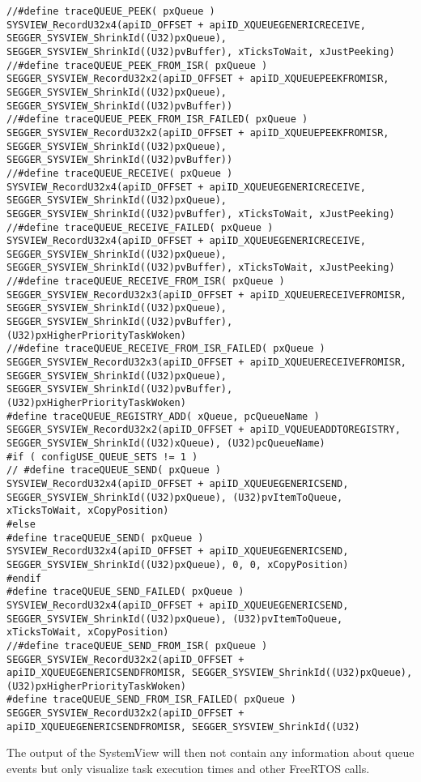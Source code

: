 \begin{lstlisting}
//#define traceQUEUE_PEEK( pxQueue )                                    SYSVIEW_RecordU32x4(apiID_OFFSET + apiID_XQUEUEGENERICRECEIVE, SEGGER_SYSVIEW_ShrinkId((U32)pxQueue), SEGGER_SYSVIEW_ShrinkId((U32)pvBuffer), xTicksToWait, xJustPeeking)
//#define traceQUEUE_PEEK_FROM_ISR( pxQueue )                           SEGGER_SYSVIEW_RecordU32x2(apiID_OFFSET + apiID_XQUEUEPEEKFROMISR, SEGGER_SYSVIEW_ShrinkId((U32)pxQueue), SEGGER_SYSVIEW_ShrinkId((U32)pvBuffer))
//#define traceQUEUE_PEEK_FROM_ISR_FAILED( pxQueue )                    SEGGER_SYSVIEW_RecordU32x2(apiID_OFFSET + apiID_XQUEUEPEEKFROMISR, SEGGER_SYSVIEW_ShrinkId((U32)pxQueue), SEGGER_SYSVIEW_ShrinkId((U32)pvBuffer))
//#define traceQUEUE_RECEIVE( pxQueue )                                 SYSVIEW_RecordU32x4(apiID_OFFSET + apiID_XQUEUEGENERICRECEIVE, SEGGER_SYSVIEW_ShrinkId((U32)pxQueue), SEGGER_SYSVIEW_ShrinkId((U32)pvBuffer), xTicksToWait, xJustPeeking)
//#define traceQUEUE_RECEIVE_FAILED( pxQueue )                          SYSVIEW_RecordU32x4(apiID_OFFSET + apiID_XQUEUEGENERICRECEIVE, SEGGER_SYSVIEW_ShrinkId((U32)pxQueue), SEGGER_SYSVIEW_ShrinkId((U32)pvBuffer), xTicksToWait, xJustPeeking)
//#define traceQUEUE_RECEIVE_FROM_ISR( pxQueue )                        SEGGER_SYSVIEW_RecordU32x3(apiID_OFFSET + apiID_XQUEUERECEIVEFROMISR, SEGGER_SYSVIEW_ShrinkId((U32)pxQueue), SEGGER_SYSVIEW_ShrinkId((U32)pvBuffer), (U32)pxHigherPriorityTaskWoken)
//#define traceQUEUE_RECEIVE_FROM_ISR_FAILED( pxQueue )                 SEGGER_SYSVIEW_RecordU32x3(apiID_OFFSET + apiID_XQUEUERECEIVEFROMISR, SEGGER_SYSVIEW_ShrinkId((U32)pxQueue), SEGGER_SYSVIEW_ShrinkId((U32)pvBuffer), (U32)pxHigherPriorityTaskWoken)
#define traceQUEUE_REGISTRY_ADD( xQueue, pcQueueName )                SEGGER_SYSVIEW_RecordU32x2(apiID_OFFSET + apiID_VQUEUEADDTOREGISTRY, SEGGER_SYSVIEW_ShrinkId((U32)xQueue), (U32)pcQueueName)
#if ( configUSE_QUEUE_SETS != 1 )
// #define traceQUEUE_SEND( pxQueue )                                    SYSVIEW_RecordU32x4(apiID_OFFSET + apiID_XQUEUEGENERICSEND, SEGGER_SYSVIEW_ShrinkId((U32)pxQueue), (U32)pvItemToQueue, xTicksToWait, xCopyPosition)
#else
#define traceQUEUE_SEND( pxQueue )                                    SYSVIEW_RecordU32x4(apiID_OFFSET + apiID_XQUEUEGENERICSEND, SEGGER_SYSVIEW_ShrinkId((U32)pxQueue), 0, 0, xCopyPosition)
#endif
#define traceQUEUE_SEND_FAILED( pxQueue )                             SYSVIEW_RecordU32x4(apiID_OFFSET + apiID_XQUEUEGENERICSEND, SEGGER_SYSVIEW_ShrinkId((U32)pxQueue), (U32)pvItemToQueue, xTicksToWait, xCopyPosition)
//#define traceQUEUE_SEND_FROM_ISR( pxQueue )                           SEGGER_SYSVIEW_RecordU32x2(apiID_OFFSET + apiID_XQUEUEGENERICSENDFROMISR, SEGGER_SYSVIEW_ShrinkId((U32)pxQueue), (U32)pxHigherPriorityTaskWoken)
#define traceQUEUE_SEND_FROM_ISR_FAILED( pxQueue )                    SEGGER_SYSVIEW_RecordU32x2(apiID_OFFSET + apiID_XQUEUEGENERICSENDFROMISR, SEGGER_SYSVIEW_ShrinkId((U32)
\end{lstlisting}
The output of the SystemView will then not contain any information about queue events but only visualize task execution times and other FreeRTOS calls.
%
%
%
%
%
%
%
